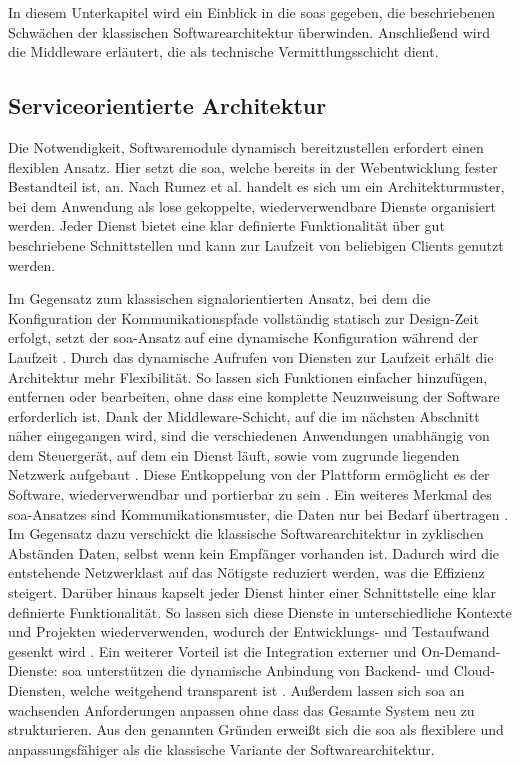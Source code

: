 In diesem Unterkapitel wird ein Einblick in die \glspl{soa} gegeben, die beschriebenen Schwächen der klassischen Softwarearchitektur überwinden. Anschließend wird die Middleware erläutert, die als technische Vermittlungsschicht dient.

\subsection{Serviceorientierte Architektur}
\label{subsect:soa}
Die Notwendigkeit, Softwaremodule dynamisch bereitzustellen erfordert einen flexiblen Ansatz. Hier setzt die \gls{soa}, welche bereits in der Webentwicklung fester Bestandteil ist, an. Nach Rumez et al.\cite{rumezOverviewAutomotiveServiceOriented2020} handelt es sich um ein Architekturmuster, bei dem Anwendung als lose gekoppelte, wiederverwendbare Dienste organisiert werden. Jeder Dienst bietet eine klar definierte Funktionalität über gut beschriebene Schnittstellen und kann zur Laufzeit von beliebigen Clients genutzt werden.

Im Gegensatz zum klassischen signalorientierten Ansatz, bei dem die Konfiguration der Kommunikationspfade vollständig statisch zur Design-Zeit erfolgt, setzt der \gls{soa}-Ansatz auf eine dynamische Konfiguration während der Laufzeit \cite{rumezOverviewAutomotiveServiceOriented2020}. Durch das dynamische Aufrufen von Diensten zur Laufzeit erhält die Architektur mehr Flexibilität. So lassen sich Funktionen einfacher hinzufügen, entfernen oder bearbeiten, ohne dass eine komplette Neuzuweisung der Software erforderlich ist. Dank der Middleware-Schicht, auf die im nächsten Abschnitt näher eingegangen wird, sind die verschiedenen Anwendungen unabhängig von dem Steuergerät, auf dem ein Dienst läuft, sowie vom zugrunde liegenden Netzwerk aufgebaut \cite{kugeleModelbasedResourceAnalysis2021}. Diese Entkoppelung von der Plattform ermöglicht es der Software, wiederverwendbar und portierbar zu sein \cite{cebotari2020}. Ein weiteres Merkmal des \gls{soa}-Ansatzes sind Kommunikationsmuster, die Daten nur bei Bedarf übertragen \cite{rumezOverviewAutomotiveServiceOriented2020}. Im Gegensatz dazu verschickt die klassische Softwarearchitektur in zyklischen Abständen Daten, selbst wenn kein Empfänger vorhanden ist. Dadurch wird die entstehende Netzwerklast auf das Nötigste reduziert werden, was die Effizienz  steigert. Darüber hinaus kapselt jeder Dienst hinter einer Schnittstelle eine klar definierte Funktionalität. So lassen sich diese Dienste in unterschiedliche Kontexte und Projekten wiederverwenden, wodurch der Entwicklungs- und Testaufwand gesenkt wird \cite{rumezOverviewAutomotiveServiceOriented2020}\cite{cebotari2020}. Ein weiterer Vorteil ist die Integration externer und On-Demand-Dienste: \gls{soa} unterstützen die dynamische Anbindung von Backend- und Cloud-Diensten, welche weitgehend transparent ist \cite{rumezOverviewAutomotiveServiceOriented2020}\cite{henle2022}. Außerdem lassen sich \gls{soa} an wachsenden Anforderungen anpassen ohne dass das Gesamte System neu zu strukturieren. Aus den genannten Gründen erweißt sich die \gls{soa} als flexiblere und anpassungsfähiger als die klassische Variante der Softwarearchitektur.

